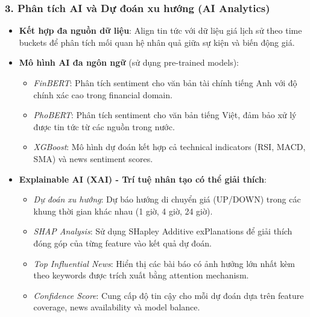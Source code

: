 \subsubsection*{3. Phân tích AI và Dự đoán xu hướng (AI Analytics)}
\begin{itemize}
    \item \textbf{Kết hợp đa nguồn dữ liệu}: Align tin tức với dữ liệu giá lịch sử theo time buckets để phân tích mối quan hệ nhân quả giữa sự kiện và biến động giá.
    
    \item \textbf{Mô hình AI đa ngôn ngữ} (sử dụng pre-trained models):
    \begin{itemize}
        \item \textit{FinBERT}: Phân tích sentiment cho văn bản tài chính tiếng Anh với độ chính xác cao trong financial domain.
        \item \textit{PhoBERT}: Phân tích sentiment cho văn bản tiếng Việt, đảm bảo xử lý được tin tức từ các nguồn trong nước.
        \item \textit{XGBoost}: Mô hình dự đoán kết hợp cả technical indicators (RSI, MACD, SMA) và news sentiment scores.
    \end{itemize}
    
    \item \textbf{Explainable AI (XAI) - Trí tuệ nhân tạo có thể giải thích}:
    \begin{itemize}
        \item \textit{Dự đoán xu hướng}: Dự báo hướng di chuyển giá (UP/DOWN) trong các khung thời gian khác nhau (1 giờ, 4 giờ, 24 giờ).
        \item \textit{SHAP Analysis}: Sử dụng SHapley Additive exPlanations để giải thích đóng góp của từng feature vào kết quả dự đoán.
        \item \textit{Top Influential News}: Hiển thị các bài báo có ảnh hưởng lớn nhất kèm theo keywords được trích xuất bằng attention mechanism.
        \item \textit{Confidence Score}: Cung cấp độ tin cậy cho mỗi dự đoán dựa trên feature coverage, news availability và model balance.
    \end{itemize}
\end{itemize}

